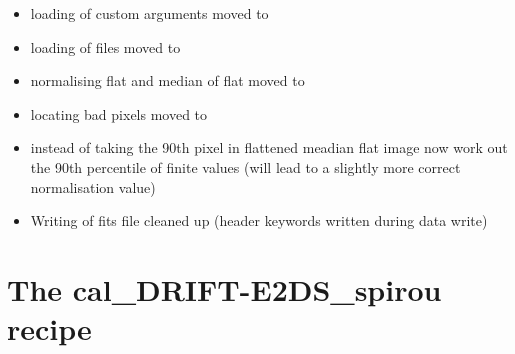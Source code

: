 \begin{itemize}
	\item loading of custom arguments moved to 

	\item loading of files moved to 

	\item normalising flat and median of flat moved to 

	\item locating bad pixels moved to 

	\item instead of taking the 90th pixel in flattened meadian flat image now work out the 90th percentile of finite values (will lead to a slightly more correct normalisation value)

	\item Writing of fits file cleaned up (header keywords written during data write)
\end{itemize}


\section{The cal\_DRIFT-E2DS\_spirou recipe}
\label{ch:changelog:At4:cal_DRIFT-E2DS_spirou}

